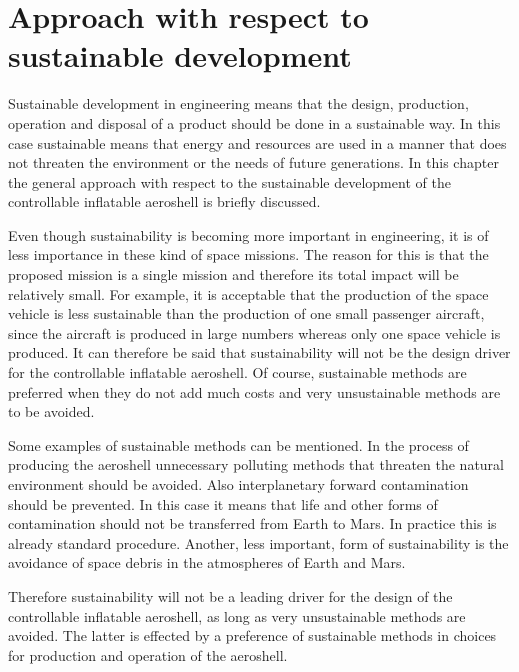 \section{Approach with respect to sustainable development}\label{cha:sustain}
Sustainable development in engineering means that the design, production, operation and disposal of a product should be done in a sustainable way. In this case sustainable means that energy and resources are used in a manner that does not threaten the environment or the needs of future generations. In this chapter the general approach with respect to the sustainable development of the controllable inflatable aeroshell is briefly discussed.

Even though sustainability is becoming more important in engineering, it is of less importance in these kind of space missions. The reason for this is that the proposed mission is a single mission and therefore its total impact will be relatively small. For example, it is acceptable that the production of the space vehicle is less sustainable than the production of one small passenger aircraft, since the aircraft is produced in large numbers whereas only one space vehicle is produced. It can therefore be said that sustainability will not be the design driver for the controllable inflatable aeroshell. Of course, sustainable methods are preferred when they do not add much costs and very unsustainable methods are to be avoided.

Some examples of sustainable methods can be mentioned. In the process of producing the aeroshell unnecessary polluting methods that threaten the natural environment should be avoided. Also interplanetary forward contamination should be prevented. In this case it means that life and other forms of contamination should not be transferred from Earth to Mars. In practice this is already standard procedure. Another, less important, form of sustainability is the avoidance of space debris in the atmospheres of Earth and Mars.

Therefore sustainability will not be a leading driver for the design of the controllable inflatable aeroshell, as long as very unsustainable methods are avoided. The latter is effected by a preference of sustainable methods in choices for production and operation of the aeroshell.